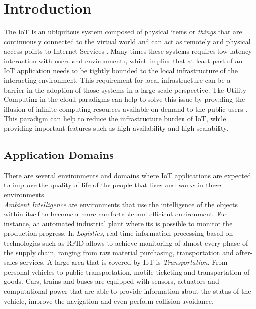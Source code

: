 

\section{Introduction}
\label{sec:introduction}
The \gls{IoT} is an ubiquitous system composed of physical items or \textit{things} that are continuously
connected to the virtual world and can act as remotely and physical access points to Internet Services \cite{mattern2010internet}.
Many times these systems requires low-latency interaction with users and environments, which implies
that at least part of an \gls{IoT} application needs to be tightly bounded to the local infrastructure
of the interacting environment. This requirement for local infrastructure can be a barrier in the
adoption of those systems in a large-scale perspective. The Utility Computing in the cloud paradigms
can help to solve this issue by providing the illusion of infinite computing resources available on
demand to the public users \cite{armbrust2010view}. This paradigm can help to reduce the infrastructure
burden of \gls{IoT}, while providing important features such as high availability and high scalability.

\subsection{Application Domains}
\label{sub:application_domains}
There are several environments and domains where \gls{IoT} applications are expected
to improve the quality of life of the people that lives and works in these environments.\\

\textit{Ambient Intelligence} are environments that use the intelligence of the objects within itself to
become a more comfortable and efficient environment. For instance, an automated industrial plant
where its is possible to monitor the production progress.
In \textit{Logistics}, real-time information processing based on technologies such as \gls{RFID} allows to
achieve monitoring of almost every phase of the supply chain, ranging from raw material purchasing,
transportation and after-sales services.
A large area that is covered by \gls{IoT} is \textit{Transportation}. From personal vehicles to public transportation,
mobile ticketing and transportation of goods. Cars, trains and buses are equipped with sensors, actuators
and computational power that are able to provide information about the status of the vehicle, improve
the navigation and even perform collision avoidance.\\

